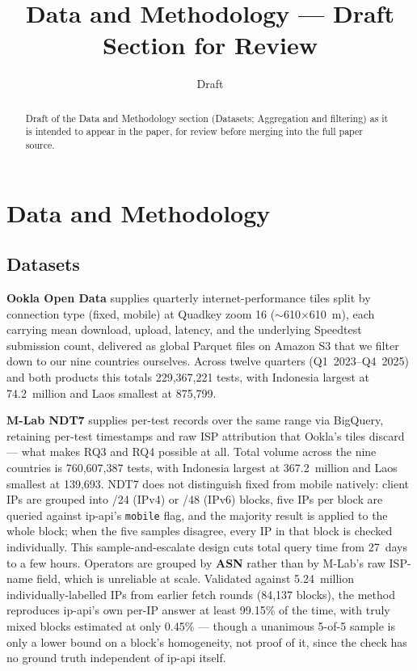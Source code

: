 \documentclass[sigconf]{acmart}
\begin{document}
\title{Data and Methodology --- Draft Section for Review}
\author{Draft}

\begin{abstract}
Draft of the Data and Methodology section (Datasets; Aggregation and filtering) as it is
intended to appear in the paper, for review before merging into the full paper source.
\end{abstract}

\maketitle

\section{Data and Methodology}

\subsection{Datasets}

\textbf{Ookla Open Data} supplies quarterly internet-performance tiles split by connection
type (fixed, mobile) at Quadkey zoom 16 ($\sim$610$\times$610~m), each carrying mean
download, upload, latency, and the underlying Speedtest submission count, delivered as
global Parquet files on Amazon S3 that we filter down to our nine countries ourselves.
Across twelve quarters (Q1~2023--Q4~2025) and both products this totals 229{,}367{,}221
tests, with Indonesia largest at 74.2~million and Laos smallest at 875{,}799.

\textbf{M-Lab NDT7} supplies per-test records over the same range via BigQuery, retaining
per-test timestamps and raw ISP attribution that Ookla's tiles discard --- what makes RQ3
and RQ4 possible at all. Total volume across the nine countries is 760{,}607{,}387 tests,
with Indonesia largest at 367.2~million and Laos smallest at 139{,}693. NDT7 does not
distinguish fixed from mobile natively: client IPs are grouped into /24 (IPv4) or /48
(IPv6) blocks, five IPs per block are queried against ip-api's \texttt{mobile} flag, and the
majority result is applied to the whole block; when the five samples disagree, every IP in
that block is checked individually. This sample-and-escalate design cuts total query time
from 27~days to a few hours. Operators are grouped by \textbf{ASN} rather than by M-Lab's
raw ISP-name field, which is unreliable at scale. Validated against 5.24~million
individually-labelled IPs from earlier fetch rounds (84{,}137 blocks), the method
reproduces ip-api's own per-IP answer at least 99.15\% of the time, with truly mixed blocks
estimated at only 0.45\% --- though a unanimous 5-of-5 sample is only a lower bound on a
block's homogeneity, not proof of it, since the check has no ground truth independent of
ip-api itself.
\end{document}
